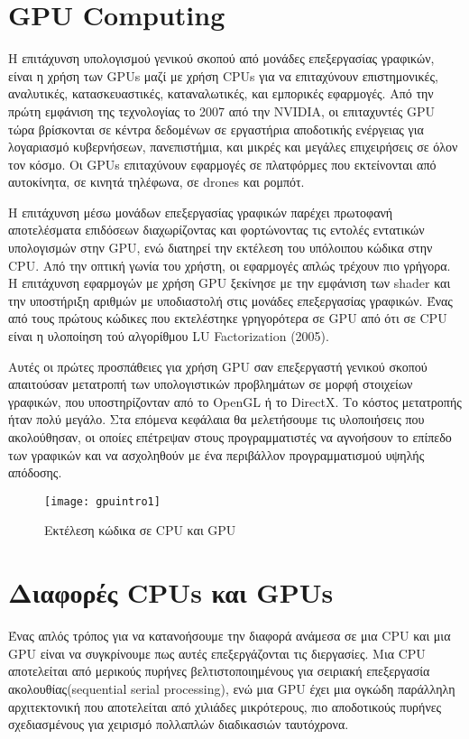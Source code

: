 \section{GPU Computing}

Η επιτάχυνση υπολογισμού γενικού σκοπού από μονάδες επεξεργασίας γραφικών, είναι η χρήση των GPUs μαζί με χρήση CPUs για να επιταχύνουν επιστημονικές, αναλυτικές, κατασκευαστικές, καταναλωτικές, και εμπορικές εφαρμογές. Από την πρώτη εμφάνιση της τεχνολογίας το 2007 από την NVIDIA, οι επιταχυντές GPU τώρα βρίσκονται σε κέντρα δεδομένων σε εργαστήρια αποδοτικής ενέργειας για λογαριασμό κυβερνήσεων, πανεπιστήμια, και μικρές και μεγάλες επιχειρήσεις σε όλον τον κόσμο. Οι GPUs επιταχύνουν εφαρμογές σε πλατφόρμες που εκτείνονται από αυτοκίνητα, σε κινητά τηλέφωνα, σε drones και ρομπότ.

Η επιτάχυνση μέσω μονάδων επεξεργασίας γραφικών παρέχει πρωτοφανή αποτελέσματα επιδόσεων διαχωρίζοντας και φορτώνοντας τις εντολές εντατικών υπολογισμών στην GPU, ενώ διατηρεί την εκτέλεση του υπόλοιπου κώδικα στην CPU. Από την οπτική γωνία του χρήστη, οι εφαρμογές απλώς τρέχουν πιο γρήγορα. H επιτάχυνση εφαρμογών με χρήση GPU ξεκίνησε με την εμφάνιση των shader και την υποστήριξη αριθμών με υποδιαστολή στις μονάδες επεξεργασίας γραφικών. Ένας από τους πρώτους κώδικες που εκτελέστηκε γρηγορότερα σε GPU από ότι σε CPU είναι η υλοποίηση τού αλγορίθμου LU Factorization (2005).

Αυτές οι πρώτες προσπάθειες για χρήση GPU σαν επεξεργαστή γενικού σκοπού απαιτούσαν μετατροπή των υπολογιστικών προβλημάτων σε μορφή στοιχείων γραφικών, που υποστηρίζονταν από το OpenGL ή το DirectX. Το κόστος μετατροπής ήταν πολύ μεγάλο. Στα επόμενα κεφάλαια θα μελετήσουμε τις υλοποιήσεις που ακολούθησαν, οι οποίες επέτρεψαν στους προγραμματιστές να αγνοήσουν το επίπεδο των γραφικών και να ασχοληθούν με ένα περιβάλλον προγραμματισμού υψηλής απόδοσης.

\begin{figure}[h]
\centering
\texttt{[image: gpuintro1]}
\caption{Εκτέλεση κώδικα σε CPU και GPU \cite{figure-1}}
\end{figure}

\section{Διαφορές CPUs και GPUs}

Ένας απλός τρόπος για να κατανοήσουμε την διαφορά ανάμεσα σε μια CPU και μια GPU είναι να συγκρίνουμε πως αυτές επεξεργάζονται τις διεργασίες. Μια CPU αποτελείται από μερικούς πυρήνες βελτιστοποιημένους για σειριακή επεξεργασία ακολουθίας(sequential serial processing), ενώ μια GPU έχει μια ογκώδη παράλληλη αρχιτεκτονική που αποτελείται από χιλιάδες μικρότερους, πιο αποδοτικούς πυρήνες σχεδιασμένους για χειρισμό πολλαπλών διαδικασιών ταυτόχρονα.

